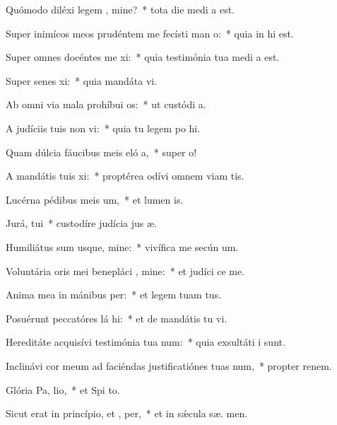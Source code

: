 \item Quómodo diléxi legem , mine?~* tota die medi a est.
\item Super inimícos meos prudéntem me fecísti man o:~* quia in  hi est.
\item Super omnes docéntes me xi:~* quia testimónia tua medi a est.
\item Super senes xi:~* quia mandáta  vi.
\item Ab omni via mala prohíbui  os:~* ut custódi  a.
\item A judíciis tuis non vi:~* quia tu legem po hi.
\item Quam dúlcia fáucibus meis eló a,~* super   o!
\item A mandátis tuis xi:~* proptérea odívi omnem viam tis.
\item Lucérna pédibus meis  um,~* et lumen  is.
\item Jurá,  tui~* custodíre judícia jus æ.
\item Humiliátus sum usque, mine:~* vivífica me secún  um.
\item Voluntária oris mei benepláci , mine:~* et judíci  ce me.
\item Anima mea in mánibus  per:~* et legem tuam   tus.
\item Posuérunt peccatóres lá hi:~* et de mandátis tu  vi.
\item Hereditáte acquisívi testimónia tua  num:~* quia exsultáti  i sunt.
\item Inclinávi cor meum ad faciéndas justificatiónes tuas  num,~* propter renem.
\item Glória Pa,  lio,~* et Spi to.
\item Sicut erat in princípio, et ,  per,~* et in sǽcula sæ. men.
